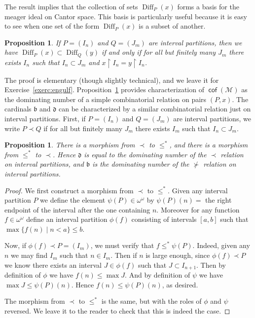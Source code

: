 \documentclass[11pt,oneside]{amsbook}
\newcommand{\Meager}{\mathcal M}
\DeclareMathOperator{\cof}{\mathsf{cof}}
\DeclareMathOperator{\Diff}{Diff}
\theoremstyle{definition}
\theoremstyle{plain}
\newtheorem{prop}[thm]{Proposition}
\theoremstyle{definition}
\theoremstyle{remark}
\numberwithin{equation}{section}
\numberwithin{figure}{section}
\begin{document}
The result implies that the collection of sets $\Diff_P(x)$ forms a basis for the meager ideal on Cantor space. This basis is particularly useful because it is easy to see when one set of the form $\Diff_P(x)$ is a subset of another.

\begin{prop}
  \label{prop:engulf}
  If $P=(I_n)$ and $Q=(J_m)$ are interval partitions, then we have $\Diff_P(x)\subset\Diff_Q(y)$ if and only if for all but finitely many $J_m$ there exists $I_n$ such that $I_n\subset J_m$ and $x\restriction I_n=y\restriction I_n$.
\end{prop}

The proof is elementary (though slightly technical), and we leave it for Exercise~\ref{exerc:engulf}. Proposition~\ref{prop:engulf} provides characterization of $\cof(\Meager)$ as the dominating number of a simple combinatorial relation on pairs $(P,x)$. The cardinals $\mathfrak b$ and $\mathfrak d$ can be characterized by a similar combinatorial relation just on interval partitions. First, if $P=(I_n)$ and $Q=(J_m)$ are interval partitions, we write $P\prec Q$ if for all but finitely many $J_m$ there exists $I_m$ such that $I_n\subset J_m$. 

\begin{prop}
  There is a morphism from $\prec$ to $\leq^*$, and there is a morphism from $\leq^*$ to $\prec$. Hence $\mathfrak d$ is equal to the dominating number of the $\prec$ relation on interval partitions, and $\mathfrak b$ is the dominating number of the $\not\succ$ relation on interval partitions.
\end{prop}

\begin{proof}
  We first construct a morphism from $\prec$ to $\leq^*$. Given any interval partition $P$ we define the element $\psi(P)\in\omega^\omega$ by $\psi(P)(n)=$ the right endpoint of the interval after the one containing $n$. Moreover for any function $f\in\omega^\omega$ define an interval partition $\phi(f)$ consisting of intervals $[a,b]$ such that $\max\{f(n)\mid n<a\}\leq b$.

  Now, if $\phi(f)\prec P=(I_m)$, we must verify that $f\leq^*\psi(P)$. Indeed, given any $n$ we may find $I_m$ such that $n\in I_m$. Then if $n$ is large enough, since $\phi(f)\prec P$ we know there exists an interval $J\in\phi(f)$ such that $J\subset I_{n+1}$. Then by definition of $\phi$ we have $f(n)\leq\max J$. And by definition of $\psi$ we have $\max J\leq\psi(P)(n)$. Hence $f(n)\leq\psi(P)(n)$, as desired.

  The morphism from $\prec$ to $\leq^*$ is the same, but with the roles of $\phi$ and $\psi$ reversed. We leave it to the reader to check that this is indeed the case.
\end{proof}
\end{document}
